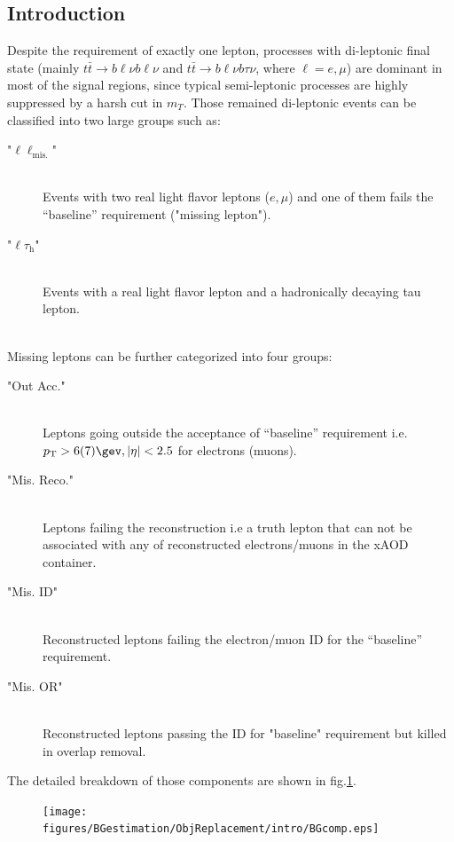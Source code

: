 \subsection{Introduction} \label{sec::ObjReplace::intro}
Despite the requirement of exactly one lepton, processes with di-leptonic final state (mainly $t\bar{t}\rightarrow b\ell\nu b\ell\nu$ and $t\bar{t}\rightarrow b\ell\nu b\tau\nu$, where $\ell = e, \mu$) are dominant in most of the signal regions, since typical semi-leptonic processes are highly suppressed by a harsh cut in $m_T$. Those remained di-leptonic events can be classified into two large groups such as:
\begin{description}
\item ["$\ell\ell_{\mathrm{mis.}}$"] \mbox{} \\ 
  Events with two real light flavor leptons ($e,\mu$) and one of them fails the ``baseline'' requirement ("missing lepton").
\item ["$\ell\tau_{\mathrm{h}}$"] \mbox{} \\
  Events with a real light flavor lepton and a hadronically decaying tau lepton. \\ \\
\end{description} 
Missing leptons can be further categorized into four groups:
\begin{description}
\item ["Out Acc."] \mbox{} \\
 Leptons going outside the acceptance of ``baseline'' requirement i.e. $p_{\mathrm{T}}>6(7)\gev, |\eta|<2.5$ for electrons (muons).
\item ["Mis. Reco."] \mbox{} \\
 Leptons failing the reconstruction i.e a truth lepton that can not be associated with any of reconstructed electrons/muons in the xAOD container.
\item ["Mis. ID"] \mbox{} \\
 Reconstructed leptons failing the electron/muon ID for the ``baseline'' requirement.
\item ["Mis. OR"] \mbox{} \\
 Reconstructed leptons passing the ID for "baseline" requirement but killed in overlap removal.
\end{description}
The detailed breakdown of those components are shown in fig.\ref{fig::ObjReplace::BGcomp}.

\clearpage
\begin{figure}
  \begin{center}
    \texttt{[image: figures/BGestimation/ObjReplacement/intro/BGcomp.eps]}
    \label{fig::ObjReplace::BGcomp}    
  \end{center}
\end{figure}

